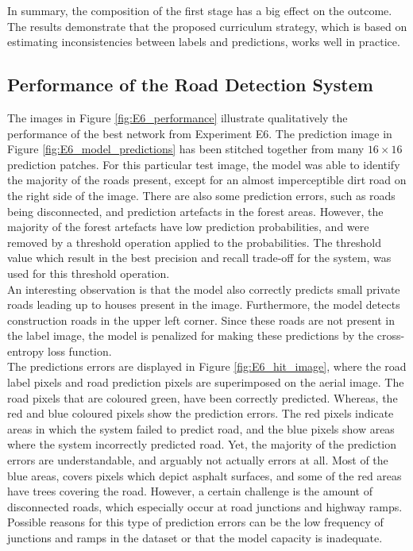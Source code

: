 In summary, the composition of the first stage has a big effect on the outcome. The results demonstrate that the proposed curriculum strategy, which is based on estimating inconsistencies between labels and predictions, works well in practice.

\subsection{Performance of the Road Detection System}
The images in Figure \ref{fig:E6_performance} illustrate qualitatively the performance of the best network from Experiment E6. The prediction image in Figure \ref{fig:E6_model_predictions} has been stitched together from many $16 \times 16$ prediction patches. For this particular test image, the model was able to identify the majority of the roads present, except for an almost imperceptible dirt road on the right side of the image. There are also some prediction errors, such as roads being disconnected, and prediction artefacts in the forest areas. However, the majority of the forest artefacts have low prediction probabilities, and were removed by a threshold operation applied to the probabilities. The threshold value which result in the best precision and recall trade-off for the system, was used for this threshold operation.\\

An interesting observation is that the model also correctly predicts small private roads leading up to houses present in the image. Furthermore, the model detects construction roads in the upper left corner. Since these roads are not present in the label image, the model is penalized for making these predictions by the cross-entropy loss function.\\

The predictions errors are displayed in Figure \ref{fig:E6_hit_image}, where the road label pixels and road prediction pixels are superimposed on the aerial image. The road pixels that are coloured green, have been correctly predicted. Whereas, the red and blue coloured pixels show the prediction errors. The red pixels indicate areas in which the system failed to predict road, and the blue pixels show areas where the system incorrectly predicted road. Yet, the majority of the prediction errors are understandable, and arguably not actually errors at all. Most of the blue areas, covers pixels which depict asphalt surfaces, and some of the red areas have trees covering the road. However, a certain challenge is the amount of disconnected roads, which especially occur at road junctions and highway ramps. Possible reasons for this type of prediction errors can be the low frequency of junctions and ramps in the dataset or that the model capacity is inadequate. \\

